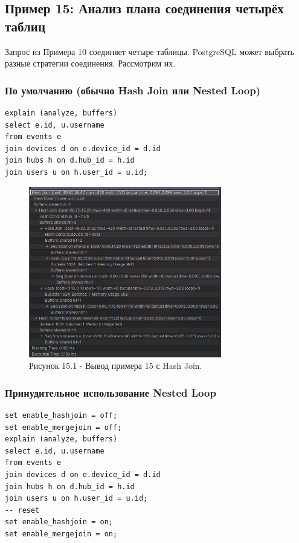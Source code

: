 \documentclass[oneside,a4paper,14pt]{extarticle}
\begin{document}
\subsection*{Пример 15: Анализ плана соединения четырёх таблиц}

Запрос из Примера 10 соединяет четыре таблицы. PostgreSQL может выбрать разные стратегии соединения. Рассмотрим их.

\subsubsection*{По умолчанию (обычно Hash Join или Nested Loop)}
\begin{verbatim}
explain (analyze, buffers)
select e.id, u.username
from events e
join devices d on e.device_id = d.id
join hubs h on d.hub_id = h.id
join users u on h.user_id = u.id;
\end{verbatim}

\begin{figure}[H]
  \centering
  \includegraphics[width=0.75\textwidth]{pics/hash_join.png}
  \caption*{Рисунок 15.1 - Вывод примера 15 с Hash Join.}
\end{figure}

\subsubsection*{Принудительное использование Nested Loop}
\begin{verbatim}
set enable_hashjoin = off;
set enable_mergejoin = off;
explain (analyze, buffers)
select e.id, u.username
from events e
join devices d on e.device_id = d.id
join hubs h on d.hub_id = h.id
join users u on h.user_id = u.id;
-- reset
set enable_hashjoin = on;
set enable_mergejoin = on;
\end{verbatim}
\end{document}
